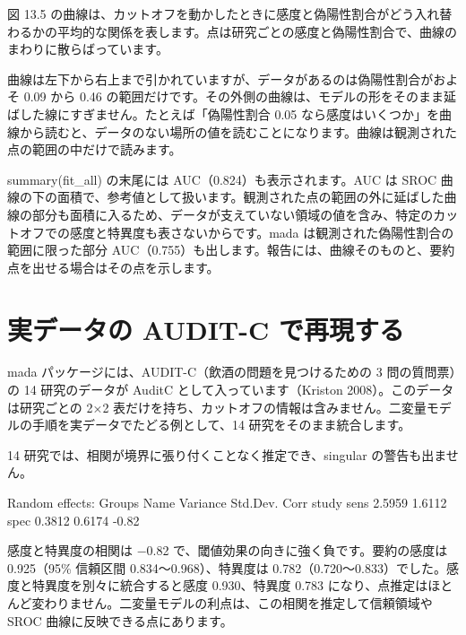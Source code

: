 
図 13.5 の曲線は、カットオフを動かしたときに感度と偽陽性割合がどう入れ替わるかの平均的な関係を表します。点は研究ごとの感度と偽陽性割合で、曲線のまわりに散らばっています。

曲線は左下から右上まで引かれていますが、データがあるのは偽陽性割合がおよそ 0.09 から 0.46 の範囲だけです。その外側の曲線は、モデルの形をそのまま延ばした線にすぎません。たとえば「偽陽性割合 0.05 なら感度はいくつか」を曲線から読むと、データのない場所の値を読むことになります。曲線は観測された点の範囲の中だけで読みます。

summary(fit\_all) の末尾には AUC（0.824）も表示されます。AUC は SROC 曲線の下の面積で、参考値として扱います。観測された点の範囲の外に延ばした曲線の部分も面積に入るため、データが支えていない領域の値を含み、特定のカットオフでの感度と特異度も表さないからです。mada は観測された偽陽性割合の範囲に限った部分 AUC（0.755）も出します。報告には、曲線そのものと、要約点を出せる場合はその点を示します。

\section{\hatten 実データの AUDIT-C で再現する}
\label{sec:13-9}

mada パッケージには、AUDIT-C（飲酒の問題を見つけるための 3 問の質問票）の 14 研究のデータが AuditC として入っています（Kriston 2008）。このデータは研究ごとの 2×2 表だけを持ち、カットオフの情報は含みません。二変量モデルの手順を実データでたどる例として、14 研究をそのまま統合します。


14 研究では、相関が境界に張り付くことなく推定でき、singular の警告も出ません。

\begin{rout}
Random effects:
 Groups Name Variance Std.Dev. Corr
 study  sens 2.5959   1.6112
        spec 0.3812   0.6174   -0.82
\end{rout}

感度と特異度の相関は −0.82 で、閾値効果の向きに強く負です。要約の感度は 0.925（95\% 信頼区間 0.834〜0.968）、特異度は 0.782（0.720〜0.833）でした。感度と特異度を別々に統合すると感度 0.930、特異度 0.783 になり、点推定はほとんど変わりません。二変量モデルの利点は、この相関を推定して信頼領域や SROC 曲線に反映できる点にあります。


